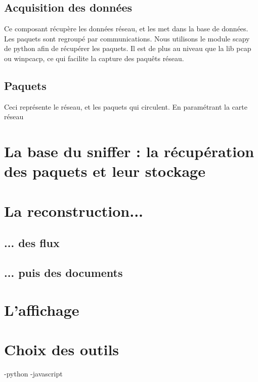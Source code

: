 \subsection{Acquisition des données}
Ce composant récupère les données réseau, et les met dans la base de données. Les paquets sont regroupé par communications.
Nous utilisons le module scapy de python afin de récupérer les paquets. Il est de plus au niveau que la lib pcap ou winpcacp, ce qui facilite la capture des paquêts réseau.

\subsection{Paquets}
Ceci représente le réseau, et les paquets qui circulent. En paramétrant la carte réseau

\section{La base du sniffer : la récupération des paquets et leur stockage}


\section{La reconstruction...}

\subsection{... des flux}

\subsection{... puis des documents}

\section{L'affichage}

\section{Choix des outils}
-python
-javascript

